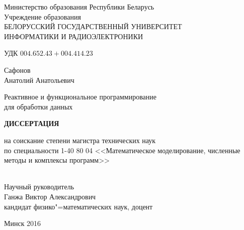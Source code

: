 \begin{titlepage}
  \begin{center}
    Министерство образования Республики Беларусь\\[1em]
    Учреждение образования\\
    БЕЛОРУССКИЙ ГОСУДАРСТВЕННЫЙ УНИВЕРСИТЕТ \\
    ИНФОРМАТИКИ И РАДИОЭЛЕКТРОНИКИ\\[2em]

    \begin{flushleft}
        УДК $004.652.43+004.414.23$\\[2cm]
    \end{flushleft}

    \begin{center}
      Сафонов \\ Анатолий Анатольевич\\[3em]
    \end{center}

    {\centering Реактивное и функциональное программирование \\ для обработки данных \\[3em]}


    {\centering\textbf{ДИССЕРТАЦИЯ}}\\[2em]

    \begin{center}
      на соискание степени магистра технических наук \\ по специальности 1-40 80 04 <<Математическое моделирование, численные методы и комплексы программ>>\\[3em]
    \end{center}

    \begin{flushright}
      \underline{\hspace*{7.5cm}} \\[1cm]
      Научный руководитель \\
      Ганжа Виктор Александрович \\
      кандидат физико"=математических наук, доцент \\[1cm]
      \underline{\hspace*{7.5cm}}
    \end{flushright}

    \vfill
    {\normalsize Минск 2016}
  \end{center}
\end{titlepage}
